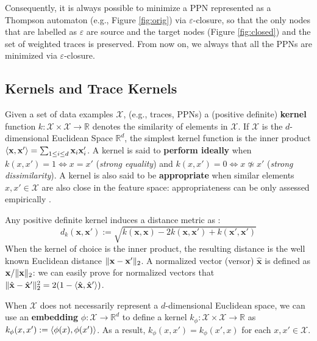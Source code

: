 Consequently, it is always possible to minimize a PPN represented as a Thompson automaton (e.g., Figure \ref{fig:orig}) via $\varepsilon$-closure, so that the only nodes that are labelled as $\varepsilon$ are source and the target nodes (Figure \ref{fig:closed}) and the set of weighted traces is preserved. From now on, we always that all the PPNs are minimized via $\varepsilon$-closure.


\subsection{Kernels and Trace Kernels}\label{subsec:katk}
Given a set of data examples $\mathcal{X}$, (e.g., traces, PPNs) a (positive definite) \textbf{kernel} function $k\colon \mathcal{X}\times \mathcal{X}\to \mathbb{R}$ denotes the similarity of elements in $\mathcal{X}$. If $\mathcal{X}$ is the $d$-dimensional Euclidean Space $\mathbb{R}^d$, the simplest kernel function is the inner product $\Braket{\mathbf{x},\mathbf{x}'}=\sum_{1\leq i\leq d}\mathbf{x}_i\mathbf{x}'_i$. 
A kernel is said to \textbf{perform ideally} \cite{Gartner03} when $k(x,x')=1\Leftrightarrow x=x'$ (\textit{strong equality}) and $k(x,x')=0\Leftrightarrow x\not\simeq x'$ (\textit{strong dissimilarity}). A kernel is also said to be \textbf{appropriate} when similar elements $x,x'\in\mathcal{X}$ are also close in the feature space: appropriateness can be only assessed  empirically \cite{Gartner03}.

Any positive definite kernel induces a distance metric as \cite{Raedt}:
\[d_k(\mathbf{x},\mathbf{x}'):=\sqrt{k(\mathbf{x},\mathbf{x})-2k(\mathbf{x},\mathbf{x}')+k(\mathbf{x}',\mathbf{x}')}\] 
When the kernel of choice is the inner product, the resulting distance is the well known Euclidean distance $\|\mathbf{x}-\mathbf{x}'\|_{2}$. A normalized vector (versor) $\hat{\mathbf{x}}$ is defined as $\mathbf{x}/\|\mathbf{x}\|_{2}$: we can easily prove for normalized vectors that $\|\hat{\mathbf{x}}-\hat{\mathbf{x}}'\|_{2}^2=2(1-\Braket{\hat{\mathbf{x}},\hat{\mathbf{x}}'})$.

When $\mathcal{X}$ does not necessarily represent a $d$-dimensional Euclidean space, we can use an \textbf{embedding} $\phi\colon\mathcal{X}\to \mathbb{R}^d$ to define a kernel $k_\phi\colon \mathcal{X}\times \mathcal{X}\to\mathbb{R}$ as $k_\phi(x,x'):=\Braket{\phi(x),\phi(x')}$. As a result, $k_\phi(x,x')=k_\phi(x',x)$ for each $x,x'\in\mathcal{X}$.

